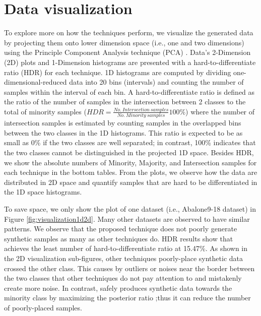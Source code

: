  



\section{Data visualization}  

To explore more on how the techniques perform, we visualize the generated data by projecting them onto lower dimension space (i.e., one and two dimensions) using the Principle Component Analysis technique (PCA) \cite{pca}. Data's 2-Dimension (2D) plots and 1-Dimension histograms are presented with a hard-to-differentiate ratio (HDR) for each technique. 1D histograms are computed by dividing one-dimensional-reduced data into 20 bins (intervals) and counting the number of samples within the interval of each bin. A hard-to-differentiate ratio is defined as the ratio of the number of samples in the intersection between 2 classes to the total of minority samples ($HDR = \frac{No.\: Intersection \: samples}{No. \: Minority \: samples}100\% $) where the number of intersection samples is estimated by counting samples in the overlapped bins between the two classes in the 1D histograms. This ratio is expected to be as small as 0\% if the two classes are well separated; in contrast, 100\% indicates that the two classes cannot be distinguished in the projected 1D space. Besides HDR, we show the absolute numbers of Minority, Majority, and Intersection samples for each technique in the bottom tables. From the plots, we observe how the data are distributed in 2D space and quantify samples that are hard to be differentiated in the 1D space histograms.       


To save space, we only show the plot of one dataset (i.e., Abalone9-18 dataset) in Figure \ref{fig:visualization1d2d}. Many other datasets are observed to have similar patterns. We observe that the proposed technique does not poorly generate synthetic samples as many as other techniques do. HDR results show that \Methodname{} achieves the least number of hard-to-differentiate ratio at 15.47\%. As shown in the 2D visualization sub-figures, other techniques poorly-place synthetic data crossed the other class. This causes by outliers or noises near the border between the two classes that other techniques do not pay attention to and mistakenly create more noise. In contrast, \Methodname{} safely produces synthetic data towards the minority class by maximizing the posterior ratio ;thus it can reduce the number of poorly-placed samples.

